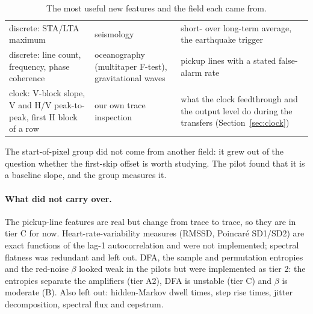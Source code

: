 \documentclass[10pt]{article}
\begin{document}
\begin{table}[H]
\begin{tabularx}{\textwidth}{>{\raggedright\arraybackslash}p{4.4cm}>{\raggedright\arraybackslash}p{3.2cm}L}
discrete: STA/LTA maximum & seismology & short- over long-term average, the earthquake trigger \\
discrete: line count, frequency, phase coherence & oceanography (multitaper F-test), gravitational waves & pickup lines with a stated false-alarm rate \cite{thomson1982} \\
clock: V-block slope, V and H/V peak-to-peak, first H block of a row & our own trace inspection & what the clock feedthrough and the output level do during the transfers (Section~\ref{sec:clock}) \\
\bottomrule
\end{tabularx}
\caption{The most useful new features and the field each came from.}
\label{tab:fields}
\end{table}

The start-of-pixel group did not come from another field: it grew out of the question whether the first-skip offset is
worth studying. The pilot found that it is a baseline slope, and the group measures it.

\paragraph{What did not carry over.} The pickup-line features are real but change from trace to trace, so they are in
tier C for now. Heart-rate-variability measures (RMSSD, Poincar\'e SD1/SD2) are exact functions of the lag-1
autocorrelation and were not implemented; spectral flatness was redundant and left out. DFA, the sample and permutation
entropies and the red-noise $\beta$ looked weak in the pilots but were implemented as tier 2: the entropies separate the
amplifiers (tier A2), DFA is unstable (tier C) and $\beta$ is moderate (B). Also left out: hidden-Markov dwell times, step rise times, jitter decomposition, spectral flux and cepstrum.
\end{document}
